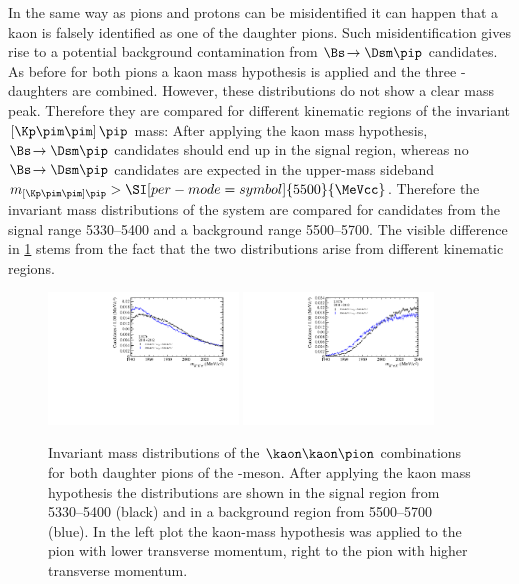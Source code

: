 In the same way as pions and protons can be misidentified it can happen that a kaon is falsely identified as one of the \Dm daughter pions.
Such misidentification gives rise to a potential background contamination from $\Bs\!\to\Dsm\pip$ candidates.
As before for both pions a kaon mass hypothesis is applied and the three \Dm-daughters are combined.
However,  these distributions do not show a clear mass peak.
Therefore they are compared for different kinematic regions of the invariant $\left[\Kp\pim\pim\right]\pip$ mass: After applying the kaon mass hypothesis, $\Bs\!\to\Dsm\pip$ candidates should end up in the \Bs signal region, whereas no $\Bs\!\to\Dsm\pip$ candidates are expected in the upper-mass sideband $m_{\left[\Kp\pim\pim\right]\pip}>\SI[per-mode=symbol]{5500}{\MeVcc}$.
Therefore the invariant mass distributions of the \kaon\kaon\pion system are compared for candidates from the \Bs signal range \SIrange[per-mode=symbol]{5330}{5400}{\MeVcc} and a background range \SIrange[per-mode=symbol]{5500}{5700}{\MeVcc}.
The visible difference in \cref{fig:DsVeto} stems from the fact that the two distributions arise from different kinematic regions.
\begin{figure}[tbp]
    \centering
    \includegraphics[width=0.45\textwidth]{06selection/figs/DsHypo1.pdf}
    \includegraphics[width=0.45\textwidth]{06selection/figs/DsHypo2.pdf}
    \caption{Invariant mass distributions of the $\kaon\kaon\pion$ combinations for both daughter pions of the \Dm-meson.
    After applying the kaon mass hypothesis the distributions are shown in the \Bs signal region from \SIrange[per-mode=symbol]{5330}{5400}{\MeVcc} (black) and in a background region from \SIrange[per-mode=symbol]{5500}{5700}{\MeVcc} (blue).
    In the left plot the kaon-mass hypothesis was applied to the pion with lower transverse momentum, right to the pion with higher transverse momentum.}
    \label{fig:DsVeto}
\end{figure}
